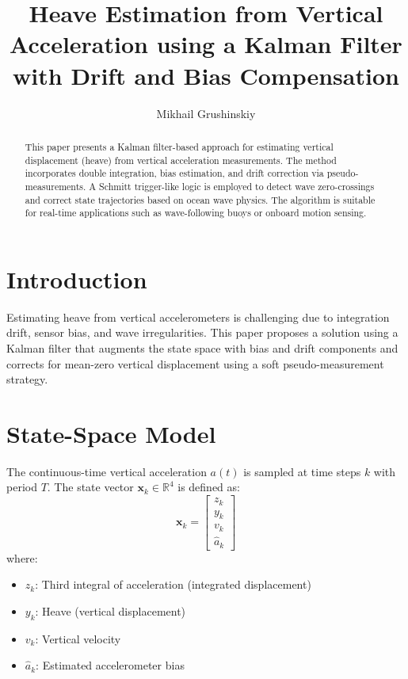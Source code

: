 \documentclass[12pt,letterpaper]{article}
\title{Heave Estimation from Vertical Acceleration using a Kalman Filter with Drift and Bias Compensation}
\author{Mikhail Grushinskiy}
\affil{Independent Researcher, 2025}
\begin{document}
\maketitle

\begin{abstract}
This paper presents a Kalman filter-based approach for estimating vertical displacement (heave) from vertical acceleration measurements. The method incorporates double integration, bias estimation, and drift correction via pseudo-measurements. A Schmitt trigger-like logic is employed to detect wave zero-crossings and correct state trajectories based on ocean wave physics. The algorithm is suitable for real-time applications such as wave-following buoys or onboard motion sensing.
\end{abstract}

\section{Introduction}
Estimating heave from vertical accelerometers is challenging due to integration drift, sensor bias, and wave irregularities. This paper proposes a solution using a Kalman filter that augments the state space with bias and drift components and corrects for mean-zero vertical displacement using a soft pseudo-measurement strategy.

\section{State-Space Model}

The continuous-time vertical acceleration \( a(t) \) is sampled at time steps \( k \) with period \( T \). The state vector \( \mathbf{x}_k \in \mathbb{R}^4 \) is defined as:
\[
\mathbf{x}_k = \begin{bmatrix}
z_k \\
y_k \\
v_k \\
\hat{a}_k
\end{bmatrix}
\]
where:
\begin{itemize}
  \item \( z_k \): Third integral of acceleration (integrated displacement)
  \item \( y_k \): Heave (vertical displacement)
  \item \( v_k \): Vertical velocity
  \item \( \hat{a}_k \): Estimated accelerometer bias
\end{itemize}
\end{document}
